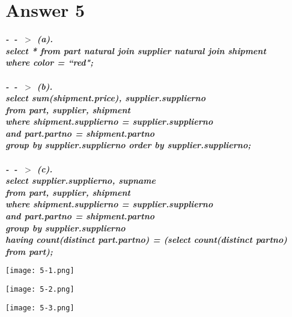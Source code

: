 \documentclass[14pt]{extarticle}
\begin{document}
\newpage
\section*{Answer 5}
\textbf{\textit{
-\ -\ $>$ (a). \\
select * from part natural join supplier natural join shipment \\
where color = ``red";\\
\\
-\ -\  $>$ (b).\\
select sum(shipment.price), supplier.supplier\textunderscore no \\ from part, supplier, shipment \\
where shipment.supplier\textunderscore no = supplier.supplier\textunderscore no \\
and part.part\textunderscore no = shipment.part\textunderscore no \\ group by supplier.supplier\textunderscore no order by supplier.supplier\textunderscore no;\\
\\
-\ -\  $>$ (c).\\
select supplier.supplier\textunderscore no, sup\textunderscore name\\
from part, supplier, shipment \\
where shipment.supplier\textunderscore no = supplier.supplier\textunderscore no \\
and part.part\textunderscore no = shipment.part\textunderscore no \\
group by supplier.supplier\textunderscore no \\
having count(distinct part.part\textunderscore no) = (select count(distinct part\textunderscore no) from part);
}}

\begin{flushleft}
    \texttt{[image: 5-1.png]}
\end{flushleft}
\begin{flushleft}
    \texttt{[image: 5-2.png]}
\end{flushleft}
\begin{flushleft}
    \texttt{[image: 5-3.png]}
\end{flushleft}
\end{document}
